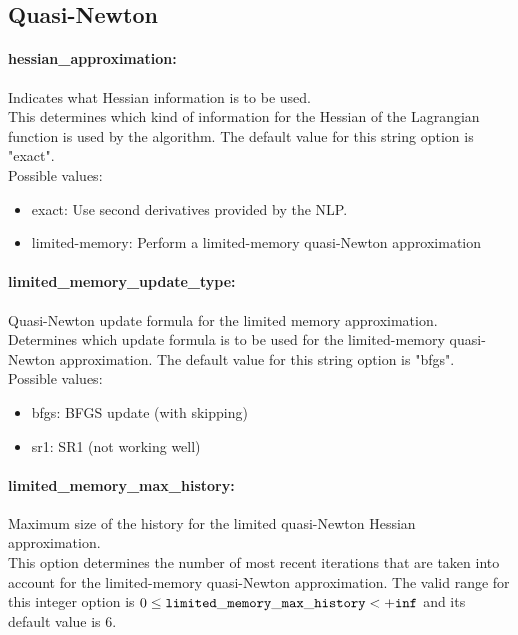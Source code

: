 \subsection{Quasi-Newton}

\paragraph{hessian\_approximation:}\label{opt:hessian_approximation} Indicates what Hessian information is to be used. \\
 This determines which kind of information for the Hessian of the Lagrangian function is used by the algorithm. The default value for this string option is "exact".
\\ 
Possible values:
\begin{itemize}
   \item exact: Use second derivatives provided by the NLP.
   \item limited-memory: Perform a limited-memory quasi-Newton approximation
\end{itemize}

\paragraph{limited\_memory\_update\_type:}\label{opt:limited_memory_update_type} Quasi-Newton update formula for the limited memory approximation. \\
 Determines which update formula is to be used for the limited-memory quasi-Newton approximation. The default value for this string option is "bfgs".
\\ 
Possible values:
\begin{itemize}
   \item bfgs: BFGS update (with skipping)
   \item sr1: SR1 (not working well)
\end{itemize}

\paragraph{limited\_memory\_max\_history:}\label{opt:limited_memory_max_history} Maximum size of the history for the limited quasi-Newton Hessian approximation. \\
 This option determines the number of most recent iterations that are taken into account for the limited-memory quasi-Newton approximation. The valid range for this integer option is
$0 \le {\tt limited\_memory\_max\_history } <  {\tt +inf}$
and its default value is $6$.


